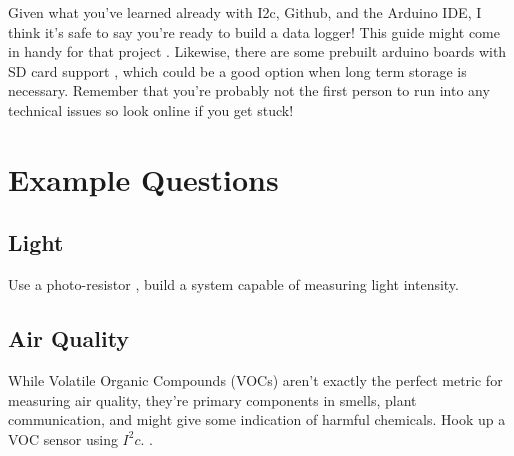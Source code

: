 \documentclass[a4paper]{article}
\begin{document}
Given what you've learned already with I2c, Github, and the Arduino IDE, I think it's safe to say you're ready to build a data logger! This guide might come in handy for that project \cite{arduino_datalogger}. Likewise, there are some prebuilt arduino boards with SD card support \cite{arduino_sd}, which could be a good option when long term storage is necessary. Remember that you're probably not the first person to run into any technical issues so look online if you get stuck!

\section{Example Questions}
\subsection{Light}
Use a photo-resistor \cite{photoresistor}, build a system capable of measuring light intensity. \cite{photoresistor_guide}

\subsection{Air Quality}
While Volatile Organic Compounds (VOCs) \cite{voc} aren't exactly the perfect metric for measuring air quality, they're primary components in smells, plant communication, and might give some indication of harmful chemicals. Hook up a VOC sensor using $I^2c$. \cite{voc_guide}.

\newpage


\end{document}

